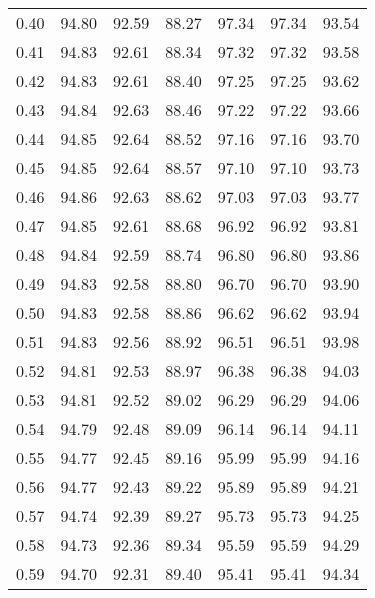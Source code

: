 \begin{tabular}{|c|c|c|c|c|c|c|}
      0.40 &     94.80 &     92.59 &      88.27 &   97.34 &      97.34 &         93.54 \\
      0.41 &     94.83 &     92.61 &      88.34 &   97.32 &      97.32 &         93.58 \\
      0.42 &     94.83 &     92.61 &      88.40 &   97.25 &      97.25 &         93.62 \\
      0.43 &     94.84 &     92.63 &      88.46 &   97.22 &      97.22 &         93.66 \\
      0.44 &     94.85 &     92.64 &      88.52 &   97.16 &      97.16 &         93.70 \\
      0.45 &     94.85 &     92.64 &      88.57 &   97.10 &      97.10 &         93.73 \\
      0.46 &     94.86 &     92.63 &      88.62 &   97.03 &      97.03 &         93.77 \\
      0.47 &     94.85 &     92.61 &      88.68 &   96.92 &      96.92 &         93.81 \\
      0.48 &     94.84 &     92.59 &      88.74 &   96.80 &      96.80 &         93.86 \\
      0.49 &     94.83 &     92.58 &      88.80 &   96.70 &      96.70 &         93.90 \\
      0.50 &     94.83 &     92.58 &      88.86 &   96.62 &      96.62 &         93.94 \\
      0.51 &     94.83 &     92.56 &      88.92 &   96.51 &      96.51 &         93.98 \\
      0.52 &     94.81 &     92.53 &      88.97 &   96.38 &      96.38 &         94.03 \\
      0.53 &     94.81 &     92.52 &      89.02 &   96.29 &      96.29 &         94.06 \\
      0.54 &     94.79 &     92.48 &      89.09 &   96.14 &      96.14 &         94.11 \\
      0.55 &     94.77 &     92.45 &      89.16 &   95.99 &      95.99 &         94.16 \\
      0.56 &     94.77 &     92.43 &      89.22 &   95.89 &      95.89 &         94.21 \\
      0.57 &     94.74 &     92.39 &      89.27 &   95.73 &      95.73 &         94.25 \\
      0.58 &     94.73 &     92.36 &      89.34 &   95.59 &      95.59 &         94.29 \\
      0.59 &     94.70 &     92.31 &      89.40 &   95.41 &      95.41 &         94.34 \\

\end{tabular}

